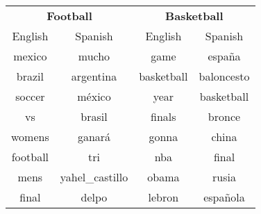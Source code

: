 \documentclass[11pt]{article}
\begin{document}
\begin{table*}%
\ffigbox
{
\footnotesize
\center
\begin{subtable}{.5\textwidth}
\centering

\begin{tabular}{|c|c||c|c|}
\hline
\multicolumn{2}{|c||}{{\bf Football}} & \multicolumn{2}{|c|}{{\bf Basketball}} \\
English & Spanish & English & Spanish \\
\hline
mexico & mucho & game & españa\\
brazil & argentina & basketball & baloncesto \\
soccer & méxico & year & basketball \\
vs & brasil & finals & bronce \\
womens & ganará & gonna & china \\
football & tri & nba & final \\
mens & yahel\_castillo & obama & rusia\\
final & delpo & lebron & española\\
\hline
\end{tabular}
\end{subtable}%
\begin{subtable}{.5\textwidth}
\centering


\end{subtable}}
\end{table*}
\end{document}
